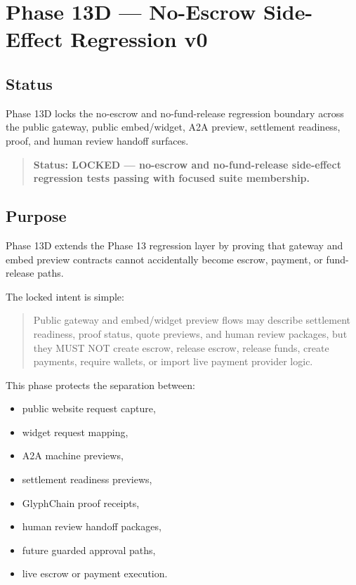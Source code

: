 \section{Phase 13D --- No-Escrow Side-Effect Regression v0}
\label{sec:aion-phase13d-no-escrow-side-effect-regression-v0}

\subsection{Status}

Phase 13D locks the no-escrow and no-fund-release regression boundary across the public gateway, public embed/widget, A2A preview, settlement readiness, proof, and human review handoff surfaces.

\begin{quote}
\textbf{Status: LOCKED --- no-escrow and no-fund-release side-effect regression tests passing with focused suite membership.}
\end{quote}

\subsection{Purpose}

Phase 13D extends the Phase 13 regression layer by proving that gateway and embed preview contracts cannot accidentally become escrow, payment, or fund-release paths.

The locked intent is simple:

\begin{quote}
Public gateway and embed/widget preview flows may describe settlement readiness, proof status, quote previews, and human review packages, but they MUST NOT create escrow, release escrow, release funds, create payments, require wallets, or import live payment provider logic.
\end{quote}

This phase protects the separation between:

\begin{itemize}
  \item public website request capture,
  \item widget request mapping,
  \item A2A machine previews,
  \item settlement readiness previews,
  \item GlyphChain proof receipts,
  \item human review handoff packages,
  \item future guarded approval paths,
  \item live escrow or payment execution.
\end{itemize}

